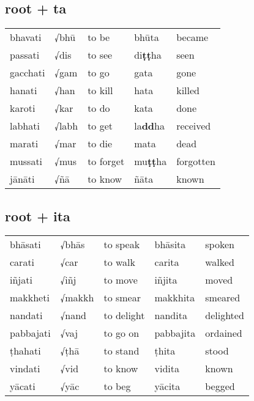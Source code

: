 \documentclass[11pt,oneside]{memoir}
\begin{document}
\subsection{root + ta}
\label{sec:org8434853}

\begin{center}
\begin{tabular}{lllll}
bhavati & √bhū & to be & bhūta & became\\[0pt]
passati & √dis & to see & di\textbf{ṭṭ}ha & seen\\[0pt]
gacchati & √gam & to go & gata & gone\\[0pt]
hanati & √han & to kill & hata & killed\\[0pt]
karoti & √kar & to do & kata & done\\[0pt]
labhati & √labh & to get & la\textbf{dd}ha & received\\[0pt]
marati & √mar & to die & mata & dead\\[0pt]
mussati & √mus & to forget & mu\textbf{ṭṭ}ha & forgotten\\[0pt]
jānāti & √ñā & to know & ñāta & known\\[0pt]
\end{tabular}
\end{center}

\subsection{root + ita}
\label{sec:org8ab885e}

\begin{center}
\begin{tabular}{lllll}
bhāsati & √bhās & to speak & bhāsita & spoken\\[0pt]
carati & √car & to walk & carita & walked\\[0pt]
iñjati & √iñj & to move & iñjita & moved\\[0pt]
makkheti & √makkh & to smear & makkhita & smeared\\[0pt]
nandati & √nand & to delight & nandita & delighted\\[0pt]
pabbajati & √vaj & to go on & pabbajita & ordained\\[0pt]
ṭhahati & √ṭhā & to stand & ṭhita & stood\\[0pt]
vindati & √vid & to know & vidita & known\\[0pt]
yācati & √yāc & to beg & yācita & begged\\[0pt]
\end{tabular}
\end{center}
\end{document}
